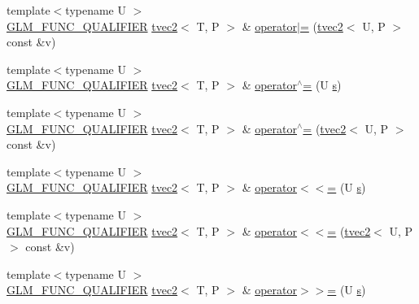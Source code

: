 \begin{DoxyCompactItemize}
\item 
{\footnotesize template$<$typename U $>$ }\\\hyperlink{setup_8hpp_a33fdea6f91c5f834105f7415e2a64407}{G\+L\+M\+\_\+\+F\+U\+N\+C\+\_\+\+Q\+U\+A\+L\+I\+F\+I\+ER} \hyperlink{structglm_1_1detail_1_1tvec2}{tvec2}$<$ T, P $>$ \& \hyperlink{structglm_1_1detail_1_1tvec2_a452fee00c19e71d024421a21bb4f3854}{operator$\vert$=} (\hyperlink{structglm_1_1detail_1_1tvec2}{tvec2}$<$ U, P $>$ const \&v)
\item 
{\footnotesize template$<$typename U $>$ }\\\hyperlink{setup_8hpp_a33fdea6f91c5f834105f7415e2a64407}{G\+L\+M\+\_\+\+F\+U\+N\+C\+\_\+\+Q\+U\+A\+L\+I\+F\+I\+ER} \hyperlink{structglm_1_1detail_1_1tvec2}{tvec2}$<$ T, P $>$ \& \hyperlink{structglm_1_1detail_1_1tvec2_a0c67c4ec90c7f05f1e509f77c78cc794}{operator$^\wedge$=} (U \hyperlink{structglm_1_1detail_1_1tvec2_a6d602cf7c31b75396944d828ad2aea72}{s})
\item 
{\footnotesize template$<$typename U $>$ }\\\hyperlink{setup_8hpp_a33fdea6f91c5f834105f7415e2a64407}{G\+L\+M\+\_\+\+F\+U\+N\+C\+\_\+\+Q\+U\+A\+L\+I\+F\+I\+ER} \hyperlink{structglm_1_1detail_1_1tvec2}{tvec2}$<$ T, P $>$ \& \hyperlink{structglm_1_1detail_1_1tvec2_a78b9cb7b25ea115e5403e0e83692249a}{operator$^\wedge$=} (\hyperlink{structglm_1_1detail_1_1tvec2}{tvec2}$<$ U, P $>$ const \&v)
\item 
{\footnotesize template$<$typename U $>$ }\\\hyperlink{setup_8hpp_a33fdea6f91c5f834105f7415e2a64407}{G\+L\+M\+\_\+\+F\+U\+N\+C\+\_\+\+Q\+U\+A\+L\+I\+F\+I\+ER} \hyperlink{structglm_1_1detail_1_1tvec2}{tvec2}$<$ T, P $>$ \& \hyperlink{structglm_1_1detail_1_1tvec2_a5e89548db90fffa27f6076b2a94f83d7}{operator$<$$<$=} (U \hyperlink{structglm_1_1detail_1_1tvec2_a6d602cf7c31b75396944d828ad2aea72}{s})
\item 
{\footnotesize template$<$typename U $>$ }\\\hyperlink{setup_8hpp_a33fdea6f91c5f834105f7415e2a64407}{G\+L\+M\+\_\+\+F\+U\+N\+C\+\_\+\+Q\+U\+A\+L\+I\+F\+I\+ER} \hyperlink{structglm_1_1detail_1_1tvec2}{tvec2}$<$ T, P $>$ \& \hyperlink{structglm_1_1detail_1_1tvec2_a501a88775ae24755acb58b2572cc3ec9}{operator$<$$<$=} (\hyperlink{structglm_1_1detail_1_1tvec2}{tvec2}$<$ U, P $>$ const \&v)
\item 
{\footnotesize template$<$typename U $>$ }\\\hyperlink{setup_8hpp_a33fdea6f91c5f834105f7415e2a64407}{G\+L\+M\+\_\+\+F\+U\+N\+C\+\_\+\+Q\+U\+A\+L\+I\+F\+I\+ER} \hyperlink{structglm_1_1detail_1_1tvec2}{tvec2}$<$ T, P $>$ \& \hyperlink{structglm_1_1detail_1_1tvec2_a7827364730dbfab98293a22f1c3a73d1}{operator$>$$>$=} (U \hyperlink{structglm_1_1detail_1_1tvec2_a6d602cf7c31b75396944d828ad2aea72}{s})

\end{DoxyCompactItemize}

